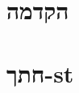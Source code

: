 \documentclass[]{article}
\def\lecnum{11}
\def\insert#1{}
\def\stcut{חתך-\textenglish{st}}
\begin{document}
\def\topcis{
רשתות זרימה
}


\section*{הקדמה}
\insert{intro}

\section*{\stcut}
\insert{cuts}
\end{document}

